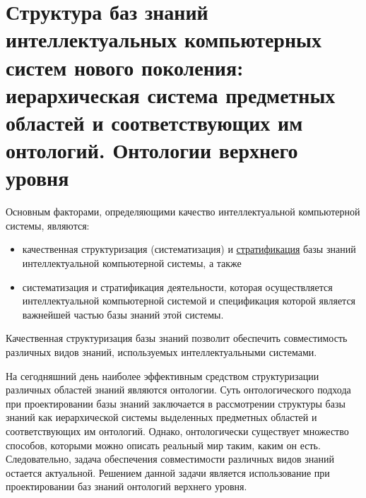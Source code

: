 \chapter{Структура баз знаний интеллектуальных компьютерных систем нового поколения: иерархическая система предметных областей и соответствующих им онтологий. Онтологии верхнего уровня}
\label{chapter_kb}


Основным факторами, определяющими качество интеллектуальной компьютерной системы, являются:
	\begin{itemize}
		\item {качественная структуризация (систематизация) и \uline{стратификация} базы знаний интеллектуальной 		компьютерной системы, а также}
		\item {систематизация и стратификация деятельности, которая осуществляется интеллектуальной компьютерной системой и спецификация которой является важнейшей частью базы знаний этой системы.}
	\end{itemize}

Качественная структуризация базы знаний позволит обеспечить совместимость различных видов знаний, используемых интеллектуальными системами.  

На сегодняшний день наиболее эффективным средством структуризации различных областей знаний являются онтологии. Суть онтологического подхода при проектировании базы знаний заключается в рассмотрении структуры базы знаний как иерархической системы выделенных предметных областей и соответствующих им онтологий. Однако, онтологически существует множество способов, которыми можно описать реальный мир таким, каким он есть. Следовательно, задача обеспечения совместимости различных видов знаний остается актуальной. Решением данной задачи является использование при проектировании баз знаний онтологий верхнего уровня.

\begin{SCn}
\end{SCn}

